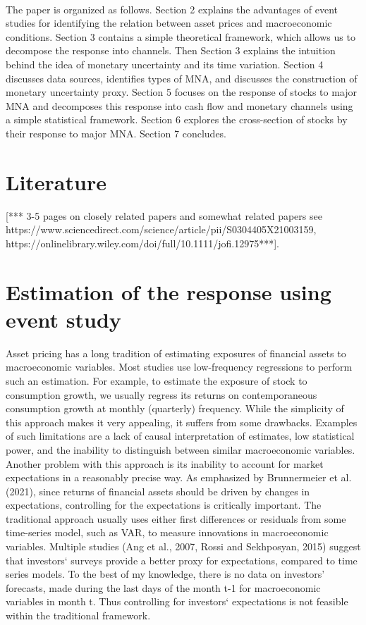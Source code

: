 \documentclass[12pt]{article}
\begin{document}
\paragraph{}
The paper is organized as follows. Section 2 explains the advantages of event studies for identifying the relation between asset prices and macroeconomic conditions. Section 3 contains a simple theoretical framework, which allows us to decompose the response into channels. Then Section 3 explains the intuition behind the idea of monetary uncertainty and its time variation. Section 4 discusses data sources, identifies types of MNA, and discusses the construction of monetary uncertainty proxy. Section 5 focuses on the response of stocks to major MNA and decomposes this response into cash flow and monetary channels using a simple statistical framework. Section 6 explores the cross-section of stocks by their response to major MNA. Section 7 concludes.

\section{Literature} 

[*** 3-5 pages on closely related papers and somewhat related papers
see https://www.sciencedirect.com/science/article/pii/S0304405X21003159,
https://onlinelibrary.wiley.com/doi/full/10.1111/jofi.12975***].


\section{Estimation of the response using event study}

Asset pricing has a long tradition of estimating exposures of financial assets to macroeconomic variables. Most studies use low-frequency regressions to perform such an estimation. For example, to estimate the exposure of stock to consumption growth, we usually regress its returns on contemporaneous consumption growth at monthly (quarterly) frequency. While the simplicity of this approach makes it very appealing, it suffers from some drawbacks. Examples of such limitations are a lack of causal interpretation of estimates, low statistical power, and the inability to distinguish between similar macroeconomic variables. Another problem with this approach is its inability to account for market expectations in a reasonably precise way. As emphasized by Brunnermeier et al. (2021), since returns of financial assets should be driven by changes in expectations, controlling for the expectations is critically important. The traditional approach usually uses either first differences or residuals from some time-series model, such as VAR, to measure innovations in macroeconomic variables. Multiple studies (Ang et al., 2007, Rossi and Sekhposyan, 2015) suggest that investors` surveys provide a better proxy for expectations, compared to time series models. To the best of my knowledge, there is no data on investors' forecasts, made during the last days of the month t-1 for macroeconomic variables in month t. Thus controlling for investors` expectations is not feasible within the traditional framework.
\end{document}
